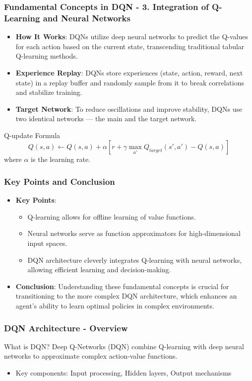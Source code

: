 \documentclass[aspectratio=169]{beamer}
\begin{document}
\begin{frame}[fragile]
    \frametitle{Fundamental Concepts in DQN - 3. Integration of Q-Learning and Neural Networks}
    \begin{itemize}
        \item \textbf{How It Works}: DQNs utilize deep neural networks to predict the Q-values for each action based on the current state, transcending traditional tabular Q-learning methods.
        \item \textbf{Experience Replay}: DQNs store experiences (state, action, reward, next state) in a replay buffer and randomly sample from it to break correlations and stabilize training.
        \item \textbf{Target Network}: To reduce oscillations and improve stability, DQNs use two identical networks — the main and the target network.
    \end{itemize}

    \begin{block}{Q-update Formula}
        \[
        Q(s, a) \gets Q(s, a) + \alpha \left[ r + \gamma \max_{a'} Q_{target}(s', a') - Q(s, a) \right]
        \]
        where $\alpha$ is the learning rate.
    \end{block}
\end{frame}

\begin{frame}[fragile]
    \frametitle{Key Points and Conclusion}
    \begin{itemize}
        \item \textbf{Key Points}:
        \begin{itemize}
            \item Q-learning allows for offline learning of value functions.
            \item Neural networks serve as function approximators for high-dimensional input spaces.
            \item DQN architecture cleverly integrates Q-learning with neural networks, allowing efficient learning and decision-making.
        \end{itemize}
        \item \textbf{Conclusion}: Understanding these fundamental concepts is crucial for transitioning to the more complex DQN architecture, which enhances an agent's ability to learn optimal policies in complex environments.
    \end{itemize}
\end{frame}

\begin{frame}[fragile]
    \frametitle{DQN Architecture - Overview}
    \begin{block}{What is DQN?}
        Deep Q-Networks (DQN) combine Q-learning with deep neural networks to approximate complex action-value functions.
    \end{block}
    \begin{itemize}
        \item Key components: Input processing, Hidden layers, Output mechanisms
    \end{itemize}
\end{frame}
\end{document}
